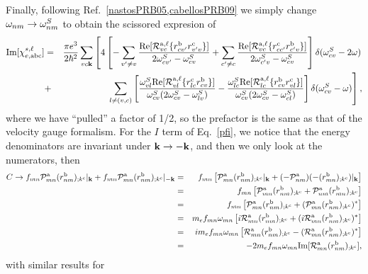 Finally, following Ref.~\ref{nastosPRB05,cabellosPRB09} we simply change
$\omega_{nm}\to\omega_{nm}^S$ to obtain the scissored expresion of
\begin{eqnarray}\label{imchies}
\mathrm{Im}[\chi_{e,\mathrm{a}\mathrm{b}\mathrm{c}}^{s,\ell}]
&=&
\frac{\pi e^3}{2\hbar^2} 
\sum_{vc\mathbf{k}}
\left[
4
\left[
-\sum_{v'\ne v}
\frac{\mathrm{Re}[{\cal R}^{\mathrm{a},\ell}_{vc}\{r^{\mathrm{b}}_{cv'}r^{\mathrm{c}}_{v'v}\}]
}{2\omega^S_{cv'}-\omega^S_{cv}}
+
\sum_{c'\ne c}
\frac{\mathrm{Re}[{\cal R}^{\mathrm{a},\ell}_{vc}\{r^{\mathrm{c}}_{cc'}r^{\mathrm{b}}_{c'v}\}]}
{2\omega^S_{c'v}-\omega^S_{cv}}
\right]
\delta(\omega^S_{cv}-2\omega)
\right.
\nonumber\\
&+&
\left.
\sum_{l\neq(v,c)}
\left[
\frac{\omega^S_{vl}\mathrm{Re}[{\cal R}^{\mathrm{a},\ell}_{vl}\{r^{\mathrm{c}}_{lc}r^{\mathrm{b}}_{cv}\}]}
{\omega^S_{cv}(2\omega^S_{cv}-\omega^S_{lv})}
-
\frac{\omega^S_{lc}\mathrm{Re}[{\cal R}^{\mathrm{a},\ell}_{lc}\{r^{\mathrm{b}}_{cv}r^{\mathrm{c}}_{vl}\}]}
{\omega^S_{cv}(2\omega^S_{cv}-\omega^S_{cl})}
\right]
\delta(\omega^S_{cv}-\omega)
\right]
,
\end{eqnarray}  
where we have ``pulled'' a factor of 1/2, so the prefactor is the same
as that of the velocity gauge formalism.\cite{cabellosPRB09} 
For the $I$ term of Eq.~\eqref{pfi}, we notice that the energy
denominators are invariant under $\mathbf{k}\to -\mathbf{k}$, and then we only
look at the numerators, then
\begin{eqnarray}\label{ct}
C\to f_{mn}{\cal P}^{\mathrm{a}}_{mn}(r^{\mathrm{b}}_{nm})_{;k^{\mathrm{c}}}|_{\mathbf{k}}
+
f_{mn}{\cal P}^{\mathrm{a}}_{mn}(r^{\mathrm{b}}_{nm})_{;k^{\mathrm{c}}}|_{-\mathbf{k}}
&=&
f_{mn}\left[{\cal P}^{\mathrm{a}}_{mn}(r^{\mathrm{b}}_{nm})_{;k^{\mathrm{c}}}|_{\mathbf{k}}
+
(-{\cal P}^{\mathrm{a}}_{nm})(-(r^{\mathrm{b}}_{mn})_{;k^{\mathrm{c}}})|_{\mathbf{k}}
\right]
\nonumber\\
&=&
f_{mn}\left[{\cal P}^{\mathrm{a}}_{mn}(r^{\mathrm{b}}_{nm})_{;k^{\mathrm{c}}}
+
{\cal P}^{\mathrm{a}}_{nm}(r^{\mathrm{b}}_{mn})_{;k^{\mathrm{c}}}
\right]
\nonumber\\
&=&
f_{mn}\left[{\cal P}^{\mathrm{a}}_{mn}(r^{\mathrm{b}}_{nm})_{;k^{\mathrm{c}}}
+
({\cal P}^{\mathrm{a}}_{mn}(r^{\mathrm{b}}_{nm})_{;k^{\mathrm{c}}})^*
\right]
\nonumber\\
&=& 
m_ef_{mn}\omega_{mn}\left[i{\cal R}^{\mathrm{a}}_{mn}(r^{\mathrm{b}}_{nm})_{;k^{\mathrm{c}}}
+
(i{\cal R}^{\mathrm{a}}_{mn}(r^{\mathrm{b}}_{nm})_{;k^{\mathrm{c}}})^*
\right]
\nonumber\\
&=& 
im_ef_{mn}\omega_{mn}\left[{\cal R}^{\mathrm{a}}_{mn}(r^{\mathrm{b}}_{nm})_{;k^{\mathrm{c}}}
-
({\cal R}^{\mathrm{a}}_{mn}(r^{\mathrm{b}}_{nm})_{;k^{\mathrm{c}}})^*
\right]
\nonumber\\
&=& 
-2m_ef_{mn}\omega_{mn}\mathrm{Im}[{\cal R}^{\mathrm{a}}_{mn}(r^{\mathrm{b}}_{nm})_{;k^{\mathrm{c}}}]
,
\end{eqnarray}
with similar results for 
